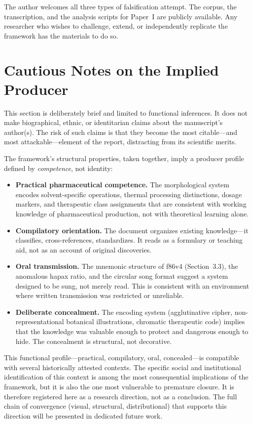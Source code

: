 \documentclass[11pt,a4paper]{article}
\begin{document}
\noindent The author welcomes all three types of falsification attempt. The corpus, the transcription, and the analysis scripts for Paper~I are publicly available. Any researcher who wishes to challenge, extend, or independently replicate the framework has the materials to do so.

\section{Cautious Notes on the Implied Producer}

This section is deliberately brief and limited to functional inferences. It does not make biographical, ethnic, or identitarian claims about the manuscript's author(s). The risk of such claims is that they become the most citable---and most attackable---element of the report, distracting from its scientific merits.

The framework's structural properties, taken together, imply a producer profile defined by \textit{competence}, not identity:

\begin{itemize}[leftmargin=2em]
\item \textbf{Practical pharmaceutical competence.} The morphological system encodes solvent-specific operations, thermal processing distinctions, dosage markers, and therapeutic class assignments that are consistent with working knowledge of pharmaceutical production, not with theoretical learning alone.
\item \textbf{Compilatory orientation.} The document organizes existing knowledge---it classifies, cross-references, standardizes. It reads as a formulary or teaching aid, not as an account of original discoveries.
\item \textbf{Oral transmission.} The mnemonic structure of f86v4 (Section~3.3), the anomalous hapax ratio, and the circular song format suggest a system designed to be sung, not merely read. This is consistent with an environment where written transmission was restricted or unreliable.
\item \textbf{Deliberate concealment.} The encoding system (agglutinative cipher, non-representational botanical illustrations, chromatic therapeutic code) implies that the knowledge was valuable enough to protect and dangerous enough to hide. The concealment is structural, not decorative.
\end{itemize}

This functional profile---practical, compilatory, oral, concealed---is compatible with several historically attested contexts. The specific social and institutional identification of this context is among the most consequential implications of the framework, but it is also the one most vulnerable to premature closure. It is therefore registered here as a research direction, not as a conclusion. The full chain of convergence (visual, structural, distributional) that supports this direction will be presented in dedicated future work.
\end{document}
